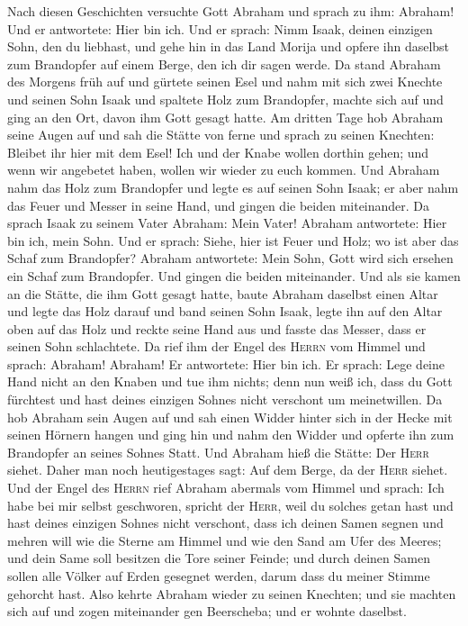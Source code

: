  Nach diesen Geschichten versuchte Gott Abraham und sprach
zu ihm: Abraham! Und er antwortete: Hier bin ich.  Und er
sprach: Nimm Isaak, deinen einzigen Sohn, den du liebhast, und gehe hin
in das Land Morija und opfere ihn daselbst zum Brandopfer auf einem
Berge, den ich dir sagen werde.  Da stand Abraham des
Morgens früh auf und gürtete seinen Esel und nahm mit sich zwei Knechte
und seinen Sohn Isaak und spaltete Holz zum Brandopfer, machte sich auf
und ging an den Ort, davon ihm Gott gesagt hatte.  Am
dritten Tage hob Abraham seine Augen auf und sah die Stätte von ferne
 und sprach zu seinen Knechten: Bleibet ihr hier mit dem
Esel! Ich und der Knabe wollen dorthin gehen; und wenn wir angebetet
haben, wollen wir wieder zu euch kommen.  Und Abraham nahm
das Holz zum Brandopfer und legte es auf seinen Sohn Isaak; er aber nahm
das Feuer und Messer in seine Hand, und gingen die beiden miteinander.
 Da sprach Isaak zu seinem Vater Abraham: Mein Vater!
Abraham antwortete: Hier bin ich, mein Sohn. Und er sprach: Siehe, hier
ist Feuer und Holz; wo ist aber das Schaf zum Brandopfer? 
Abraham antwortete: Mein Sohn, Gott wird sich ersehen ein Schaf zum
Brandopfer. Und gingen die beiden miteinander.  Und als
sie kamen an die Stätte, die ihm Gott gesagt hatte, baute Abraham
daselbst einen Altar und legte das Holz darauf und band seinen Sohn
Isaak, legte ihn auf den Altar oben auf das Holz  und
reckte seine Hand aus und fasste das Messer, dass er seinen Sohn
schlachtete.  Da rief ihm der Engel des \textsc{Herrn}
vom Himmel und sprach: Abraham! Abraham! Er antwortete: Hier bin ich.
 Er sprach: Lege deine Hand nicht an den Knaben und tue
ihm nichts; denn nun weiß ich, dass du Gott fürchtest und hast deines
einzigen Sohnes nicht verschont um meinetwillen.  Da hob
Abraham sein Augen auf und sah einen Widder hinter sich in der Hecke mit
seinen Hörnern hangen und ging hin und nahm den Widder und opferte ihn
zum Brandopfer an seines Sohnes Statt.  Und Abraham hieß
die Stätte: Der \textsc{Herr} siehet. Daher man noch heutigestages sagt:
Auf dem Berge, da der \textsc{Herr} siehet.  Und der
Engel des \textsc{Herrn} rief Abraham abermals vom Himmel
 und sprach: Ich habe bei mir selbst geschworen, spricht
der \textsc{Herr}, weil du solches getan hast und hast deines einzigen
Sohnes nicht verschont,  dass ich deinen Samen segnen und
mehren will wie die Sterne am Himmel und wie den Sand am Ufer des
Meeres; und dein Same soll besitzen die Tore seiner Feinde;
 und durch deinen Samen sollen alle Völker auf Erden
gesegnet werden, darum dass du meiner Stimme gehorcht hast.
 Also kehrte Abraham wieder zu seinen Knechten; und sie
machten sich auf und zogen miteinander gen Beerscheba; und er wohnte
daselbst.

